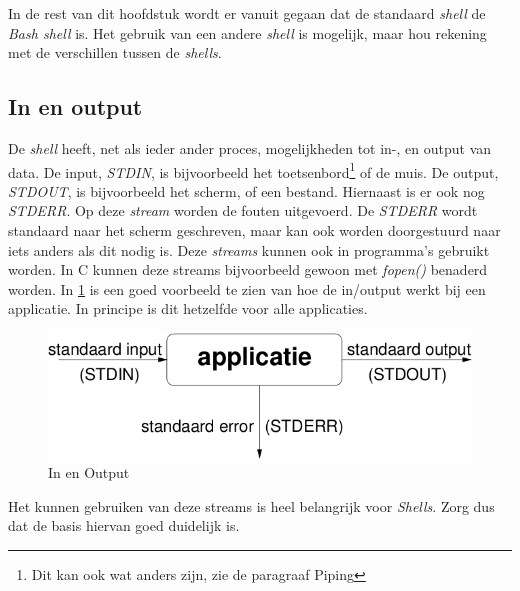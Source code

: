 In de rest van dit hoofdstuk wordt er vanuit gegaan dat de standaard \emph{shell} de \emph{Bash shell} is. Het gebruik van een andere \emph{shell} is mogelijk, maar hou rekening met de verschillen tussen de \emph{shells}. 

\subsection{In en output}
De \emph{shell} heeft, net als ieder ander proces, mogelijkheden tot in-, en output van data. De input, \emph{STDIN}, is bijvoorbeeld het toetsenbord\footnote{Dit kan ook wat anders zijn, zie de paragraaf Piping} of de muis. De output, \emph{STDOUT}, is bijvoorbeeld het scherm, of een bestand. Hiernaast is er ook nog \emph{STDERR}. Op deze \emph{stream} worden de fouten uitgevoerd. De \emph{STDERR} wordt standaard naar het scherm geschreven, maar kan ook worden doorgestuurd naar iets anders als dit nodig is. Deze \emph{streams} kunnen ook in programma's gebruikt worden. In C kunnen deze streams bijvoorbeeld gewoon met \emph{fopen()} benaderd worden. In \ref{fig:output} is een goed voorbeeld te zien van hoe de in/output werkt bij een applicatie. In principe is dit hetzelfde voor alle applicaties.
\begin{figure}[H]
  \begin{center}
    \includegraphics[scale=0.5]{images/inout}
  \end{center}
  \caption{In en Output}
  \label{fig:output}
\end{figure}
Het kunnen gebruiken van deze streams is heel belangrijk voor \emph{Shells}. Zorg dus dat de basis hiervan goed duidelijk is. 

